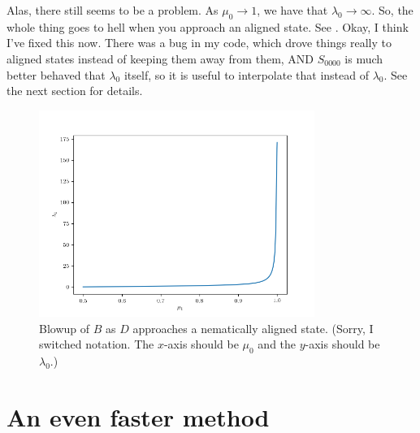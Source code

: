 \documentclass{article}
\begin{document}
Alas, there still seems to be a problem. As $\mu_0\to1$, we have that $\lambda_0\to\infty$. So, the whole thing goes to hell when you approach an aligned state. See . Okay, I think I've fixed this now. There was a bug in my code, which drove things really to aligned states instead of keeping them away from them, AND $S_{0000}$ is much better behaved that $\lambda_0$ itself, so it is useful to interpolate that instead of $\lambda_0$. See the next section for details.
\begin{figure}
    \centering
    \includegraphics[width=0.8\textwidth]{problem}
    \caption{Blowup of $B$ as $D$ approaches a nematically aligned state. (Sorry, I switched notation. The $x$-axis should be $\mu_0$ and the $y$-axis should be $\lambda_0$.)}
    \label{fig:problem}
\end{figure}

\section{An even faster method}
\end{document}
